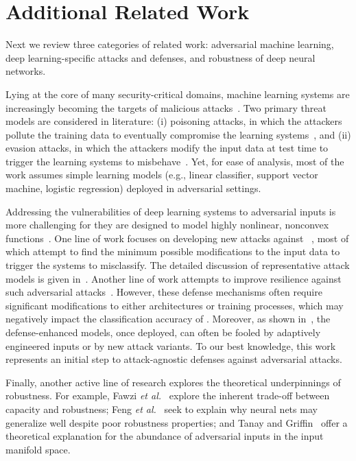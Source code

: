 \section{Additional Related Work}
\label{sec:literature}


Next we review three categories of related work: adversarial machine learning, deep learning-specific attacks and defenses, and robustness of deep neural networks.


Lying at the core of many security-critical domains, machine learning systems are increasingly becoming the targets of malicious attacks~\cite{Barreno:2006:asiaccs,Huang:2011:aisec,Barreno:2010:SML}. Two primary threat models are considered in literature: (i) poisoning attacks, in which the attackers pollute the training data to eventually compromise the learning systems~\cite{Biggio:2012:icml,Xiao:2015:SVM,Rubinstein:2009:imc}, and (ii) evasion attacks, in which the attackers modify the input data at test time to trigger the learning systems to misbehave~\cite{Dalvi:2004:kdd,Lowd:2005:kdd,Nelson:2012:QSE}. Yet, for ease of analysis, most of the work assumes simple learning models (e.g., linear classifier, support vector machine, logistic regression) deployed in adversarial settings.

Addressing the vulnerabilities of deep learning systems to adversarial inputs is more challenging for they are designed to model highly nonlinear, nonconvex functions~\cite{Nguyen:2015:cvpr,Sabour:2016:iclr}. One line of work focuses on developing new attacks against \dnns~\cite{Goodfellow:2014:arxiv,Huang:2015:arxiv,Tabacof:2015:arXiv,Papernot:2016:eurosp,Carlini:2016:arXiv}, most of which attempt to find the minimum possible modifications to the input data to trigger the systems to misclassify.
The detailed discussion of representative attack models is given in~. Another line of work attempts to improve \dnns resilience against such adversarial attacks~\cite{Goodfellow:2014:arxiv,Gu:2014:arxiv,Huang:2015:arxiv,Papernot:2016:sp}. However, these defense mechanisms often require significant modifications to either \dnn architectures or training processes, which may negatively impact the classification accuracy of \dnns. Moreover, as shown in~, the defense-enhanced models, once deployed, can often be fooled by adaptively engineered inputs or by new attack variants. To our best knowledge, this work represents an initial step to attack-agnostic defenses against adversarial attacks.

Finally, another active line of research explores the theoretical underpinnings of \dnn robustness. For example,
Fawzi {\em et al.}~\cite{Fawzi:2015:arxiv} explore the inherent trade-off between \dnn capacity and robustness;
Feng {\em et al.}~\cite{Feng:2016:arXiv} seek to explain why neural nets may generalize well despite poor robustness properties;
and Tanay and Griffin~\cite{Tanay:2016:arxiv} offer a theoretical explanation for the abundance of adversarial inputs in the input manifold space.

